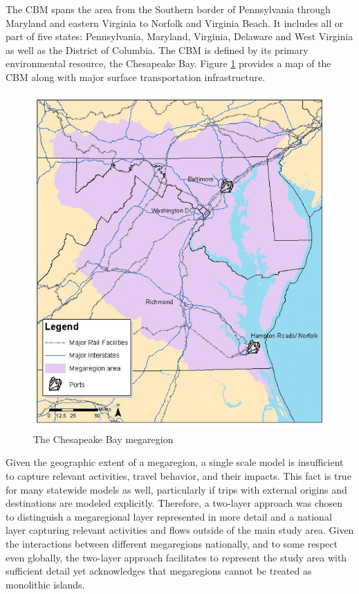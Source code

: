 The CBM spans the area from the Southern border of Pennsylvania through Maryland and eastern Virginia to Norfolk and Virginia Beach. It includes all or part of five states: Pennsylvania, Maryland, Virginia, Delaware and West Virginia as well as the District of Columbia. The CBM is defined by its primary environmental resource, the Chesapeake Bay. Figure \ref{fig:chesapeake-bay-megaregion} provides a map of the CBM along with major surface transportation infrastructure.

\begin{figure}[!t]   %
\centering
\includegraphics[scale=0.5]{graphics/48-chesapeake-bay-megaregion}
\caption{The Chesapeake Bay megaregion}
\label{fig:chesapeake-bay-megaregion}
\end{figure}

Given the geographic extent of a megaregion, a single scale model is insufficient to capture relevant activities, travel behavior, and their impacts. This fact is true for many statewide models as well, particularly if trips with external origins and destinations are modeled explicitly. Therefore, a two-layer approach was chosen to distinguish a megaregional layer represented in more detail and a national layer capturing relevant activities and flows outside of the main study area. Given the interactions between different megaregions nationally, and to some respect even globally, the two-layer approach facilitates to represent the study area with sufficient detail yet acknowledges that megaregions cannot be treated as monolithic islands.

